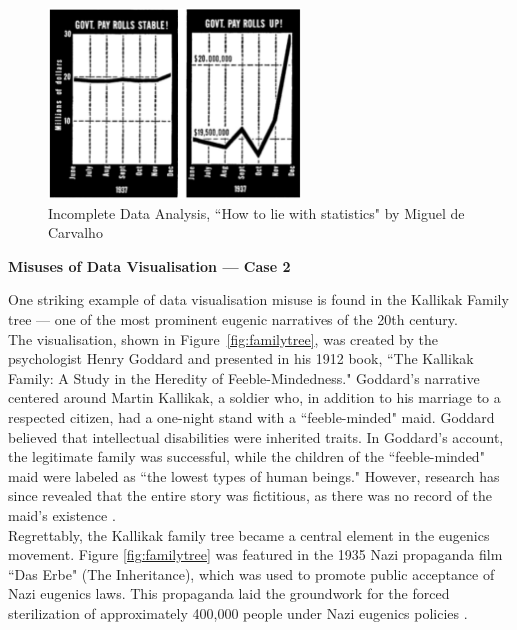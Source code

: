 \documentclass{article}\usepackage[]{graphicx}\usepackage[]{xcolor}
\numberwithin{equation}{section}
\begin{document}
\begin{figure}[H]
    \centering
    \includegraphics[width=0.6\textwidth]{image_reference/misuse1.png}
    \caption{Incomplete Data Analysis, ``How to lie with statistics" by Miguel de Carvalho \cite{lie}}
    \label{fig:misuse1}
\end{figure}

\noindent 
\textbf{Misuses of Data Visualisation — Case 2}

\noindent
One striking example of data visualisation misuse is found in the Kallikak Family tree — one of the most prominent eugenic narratives of the 20th century.\\

\noindent
The visualisation, shown in Figure~\ref{fig:familytree}, was created by the psychologist Henry Goddard and presented in his 1912 book, ``The Kallikak Family: A Study in the Heredity of Feeble-Mindedness." Goddard's narrative centered around Martin Kallikak, a soldier who, in addition to his marriage to a respected citizen, had a one-night stand with a ``feeble-minded" maid. Goddard believed that intellectual disabilities were inherited traits. In Goddard's account, the legitimate family was successful, while the children of the ``feeble-minded" maid were labeled as ``the lowest types of human beings." However, research has since revealed that the entire story was fictitious, as there was no record of the maid's existence \cite{fakedata}.\\

\noindent
Regrettably, the Kallikak family tree became a central element in the eugenics movement. Figure \ref{fig:familytree} was featured in the 1935 Nazi propaganda film ``Das Erbe" (The Inheritance), which was used to promote public acceptance of Nazi eugenics laws. This propaganda laid the groundwork for the forced sterilization of approximately 400,000 people under Nazi eugenics policies \cite{eugenics}.
\end{document}
